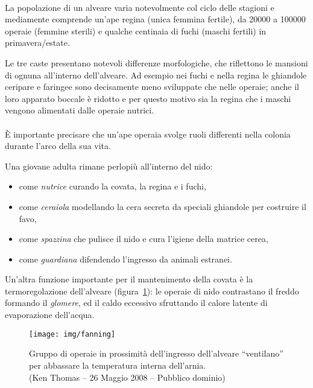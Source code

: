 \paragraph{}
La popolazione di un alveare varia notevolmente col ciclo delle stagioni e mediamente comprende un'ape regina (unica femmina fertile), da 20000 a 100000 operaie (femmine sterili) e qualche centinaia di fuchi (maschi fertili) in primavera/estate.

Le tre caste presentano notevoli differenze morfologiche, che riflettono le mansioni di ognuna all'interno dell'alveare.
Ad esempio nei fuchi e nella regina le ghiandole ceripare e faringee sono decisamente meno sviluppate che nelle operaie; anche il loro apparato boccale è ridotto e per questo motivo sia la regina che i maschi vengono alimentati dalle operaie nutrici.

\paragraph{}
È importante precisare che un'ape operaia svolge ruoli differenti nella colonia durante l'arco della sua vita.

Una giovane adulta rimane perlopiù all'interno del nido:
\begin{itemize}
    \item come \emph{nutrice} curando la covata, la regina e i fuchi,
    \item come \emph{ceraiola} modellando la cera secreta da speciali ghiandole per costruire il favo,
    \item come \emph{spazzina} che pulisce il nido e cura l'igiene della matrice cerea,
    \item come \emph{guardiana} difendendo l'ingresso da animali estranei.
\end{itemize}

Un'altra funzione importante per il mantenimento della covata è la termoregolazione dell'alveare (figura~\ref{img:fanning}):
le operaie di nido contrastano il freddo formando il \emph{glomere}, ed il caldo eccessivo sfruttando il calore latente di evaporazione dell'acqua.

\begin{figure}[hbp]
    \centering
    \texttt{[image: img/fanning]}

    \caption[Ventilazione forzata per raffrescare l'interno dell'arnia.]{Gruppo di operaie in
        prossimità dell'ingresso dell'alveare ``ventilano'' per abbassare la
        temperatura interna dell'arnia.
        \\ (Ken Thomas -- 26 Maggio 2008 -- Pubblico dominio)
    }
    \label{img:fanning}
\end{figure}


